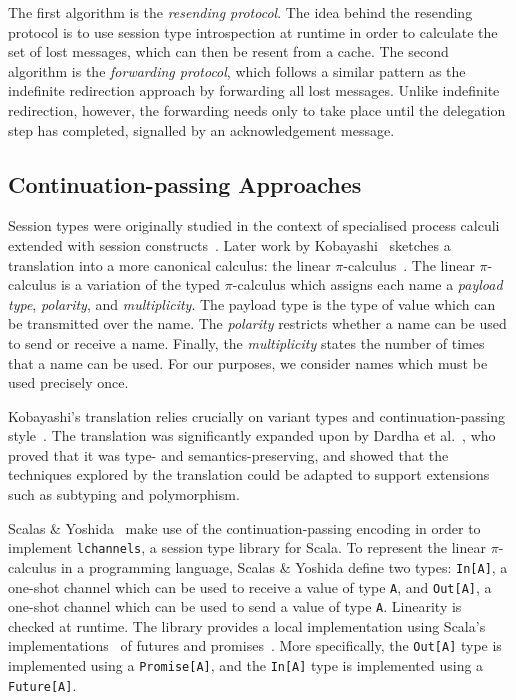 \documentclass[
graybox,
envcountchap
]{svmult}
\begin{document}
\begin{bibunit}
  The first algorithm is the \emph{resending protocol}. The idea behind the
  resending protocol is to use session type introspection at runtime in order to
  calculate the set of lost messages, which can then be resent from a cache. The
  second algorithm is the \emph{forwarding protocol}, which follows a similar
  pattern as the indefinite redirection approach by forwarding all lost
  messages. Unlike indefinite redirection, however, the forwarding needs only to
  take place until the delegation step has completed, signalled by an
  acknowledgement message.

  \subsection{Continuation-passing Approaches}

  Session types were originally studied in the context of specialised process
  calculi extended with session constructs~\cite{Honda93:dyadic,
  HondaVK98:primitives}. Later work by Kobayashi~\cite{Kobayashi02:type-systems}
  sketches a translation into a more canonical calculus: the linear
  $\pi$-calculus~\cite{KobayashiPT99:linear-pi}. The linear $\pi$-calculus is a
  variation of the typed $\pi$-calculus which assigns each name a \emph{payload type},
  \emph{polarity}, and \emph{multiplicity}. The payload type is the type of
  value which can be transmitted over the name. The \emph{polarity} restricts
  whether a name can be used to send or receive a name. Finally, the
  \emph{multiplicity} states the number of times that a name can be used. For
  our purposes, we consider names which must be used precisely once.

  Kobayashi's translation relies crucially on variant types and continuation-passing
  style~\cite{SussmanS98:scheme}. The translation was significantly
  expanded upon by Dardha et al.~\cite{DardhaGS17:revisited}, who proved that
  it was type- and semantics-preserving, and showed that the
  techniques explored by the translation could be adapted to support extensions
  such as subtyping and polymorphism.

  Scalas \& Yoshida~\cite{ScalasY16:session-scala} make use of the
  continuation-passing encoding in order to implement \texttt{lchannels}, a
  session type library for Scala.
  To represent the linear $\pi$-calculus in a programming language, Scalas \&
  Yoshida define two types: \verb+In[A]+, a one-shot channel which can be used
  to receive a value of type \verb+A+, and \verb+Out[A]+, a one-shot channel
  which can be used to send a value of type \verb+A+.
  Linearity is checked at runtime. The library provides a
  local implementation using Scala's
  implementations~\cite{HallerPMKKJ:futures} of futures and
  promises~\cite{LiskovS88:promises}. More specifically, the \verb+Out[A]+ type
  is implemented using a \verb+Promise[A]+, and the \verb+In[A]+ type is
  implemented using a \verb+Future[A]+.


\end{bibunit}
\end{document}
